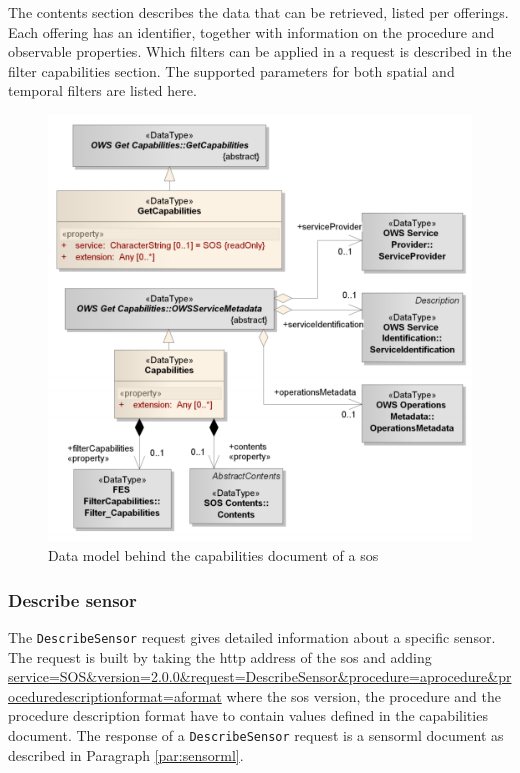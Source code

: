 The contents section describes the data that can be retrieved, listed per offerings. Each offering has an identifier, together with information on the procedure and observable properties. Which filters can be applied in a request is described in the filter capabilities section. The supported parameters for both spatial and temporal filters are listed here.

\begin{figure}
	\centering
	\includegraphics[width=0.7\linewidth]{figs/SOS_2_dataModel_GetCapabilities.PNG}
	\caption{Data model behind the capabilities document of a \ac{sos} \citep{SW:OGC2}}
	\label{fig:Capabilities}
\end{figure}

\subsubsection{Describe sensor}

\begin{sloppypar}
	The \texttt{DescribeSensor} request gives detailed information about a specific sensor. The request is built by taking the \ac{http} address of the \ac{sos} and adding \url{service=SOS\&version=2.0.0\&request=DescribeSensor\&procedure=aprocedure\&proceduredescriptionformat=aformat} where the \ac{sos} version, the procedure and the procedure description format have to contain values defined in the capabilities document. The response of a \texttt{DescribeSensor} request is a \ac{sensorml} document as described in Paragraph \ref{par:sensorml}.
\end{sloppypar}


